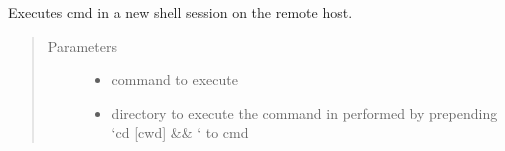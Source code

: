 \documentclass[letterpaper,12pt,english]{sphinxmanual}
\begin{document}
\begin{fulllineitems}
\begin{fulllineitems}
\begin{quote}
\begin{description}
\end{description}\end{quote}

\end{fulllineitems}


\begin{fulllineitems}
\label{\detokenize{PARyOpt.evaluators:PARyOpt.evaluators.connection.Connection.connect}}
\end{fulllineitems}


\begin{fulllineitems}
\label{\detokenize{PARyOpt.evaluators:PARyOpt.evaluators.connection.Connection.exec_command}}
\sphinxAtStartPar
Executes cmd in a new shell session on the remote host.
\begin{quote}\begin{description}
\item[{Parameters}] \leavevmode\begin{itemize}
\item {} 
\sphinxAtStartPar
{} \textendash{} command to execute

\item {} 
\sphinxAtStartPar
{} \textendash{} directory to execute the command in \sphinxhyphen{} performed by prepending ‘cd {[}cwd{]} \&\& ‘ to cmd


\end{itemize}
\end{description}
\end{quote}
\end{fulllineitems}
\end{fulllineitems}
\end{document}
